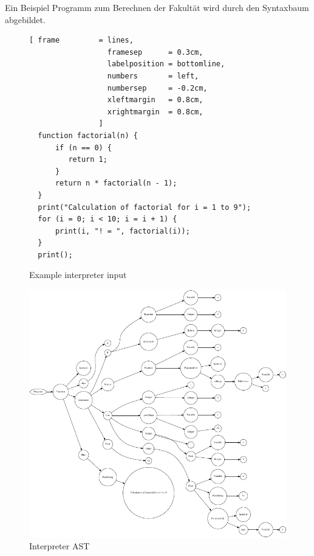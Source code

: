 Ein Beispiel Programm  zum Berechnen der Fakultät wird durch den Syntaxbaum  abgebildet.
\begin{figure}[!ht]

\begin{Verbatim}[ frame         = lines, 
                  framesep      = 0.3cm, 
                  labelposition = bottomline,
                  numbers       = left,
                  numbersep     = -0.2cm,
                  xleftmargin   = 0.8cm,
                  xrightmargin  = 0.8cm,
                ]
  function factorial(n) {
      if (n == 0) {
         return 1;
      }
      return n * factorial(n - 1);
  }
  print("Calculation of factorial for i = 1 to 9");
  for (i = 0; i < 10; i = i + 1) {
      print(i, "! = ", factorial(i));
  }
  print();
		\end{Verbatim}
\caption{Example interpreter input}
\label{fig:example_interpreter_input}
\end{figure}
%
%


\begin{figure}
	\centering
		\includegraphics{interpreter_tree.pdf}
	\caption{Interpreter AST}
	\label{fig:interpreter_tree}
\end{figure}

